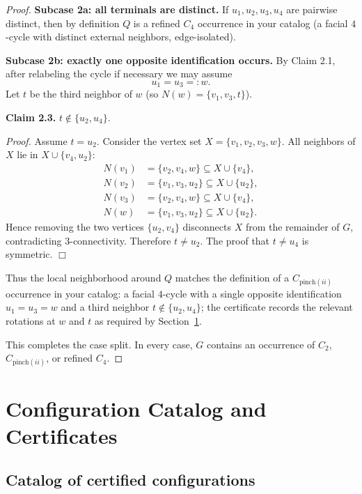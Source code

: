 \documentclass[12pt]{article}
\theoremstyle{definition}
\begin{document}
\begin{proof}
\medskip
\noindent\textbf{Subcase 2a: all terminals are distinct.}
If $u_1,u_2,u_3,u_4$ are pairwise distinct, then by definition $Q$ is a refined $C_4$
occurrence in your catalog (a facial $4$-cycle with distinct external neighbors, edge-isolated).

\medskip
\noindent\textbf{Subcase 2b: exactly one opposite identification occurs.}
By Claim 2.1, after relabeling the cycle if necessary we may assume
\[
u_1=u_3=:w.
\]
Let $t$ be the third neighbor of $w$ (so $N(w)=\{v_1,v_3,t\}$).

\smallskip
\noindent\textbf{Claim 2.3.} $t\notin\{u_2,u_4\}$.

\smallskip
\noindent\emph{Proof.}
Assume $t=u_2$. Consider the vertex set $X=\{v_1,v_2,v_3,w\}$.
All neighbors of $X$ lie in $X\cup\{v_4,u_2\}$:
\[
\begin{aligned}
N(v_1)&=\{v_2,v_4,w\}\subseteq X\cup\{v_4\},\\
N(v_2)&=\{v_1,v_3,u_2\}\subseteq X\cup\{u_2\},\\
N(v_3)&=\{v_2,v_4,w\}\subseteq X\cup\{v_4\},\\
N(w)&=\{v_1,v_3,u_2\}\subseteq X\cup\{u_2\}.
\end{aligned}
\]
Hence removing the two vertices $\{u_2,v_4\}$ disconnects $X$ from the remainder of $G$,
contradicting $3$-connectivity. Therefore $t\neq u_2$. The proof that $t\neq u_4$ is symmetric.
\hfill$\Box$

\smallskip
\noindent
Thus the local neighborhood around $Q$ matches the definition of a $C_{\mathrm{pinch}(ii)}$
occurrence in your catalog: a facial $4$-cycle with a single opposite identification $u_1=u_3=w$
and a third neighbor $t\notin\{u_2,u_4\}$; the certificate records the relevant rotations
at $w$ and $t$ as required by Section~\ref{sec:catalog}.

\medskip
\noindent
This completes the case split. In every case, $G$ contains an occurrence of
$C_2$, $C_{\mathrm{pinch}(ii)}$, or refined $C_4$.
\end{proof}

\section{Configuration Catalog and Certificates}
\label{sec:catalog}

\subsection{Catalog of certified configurations}
\label{subsec:catalog}
\end{document}
